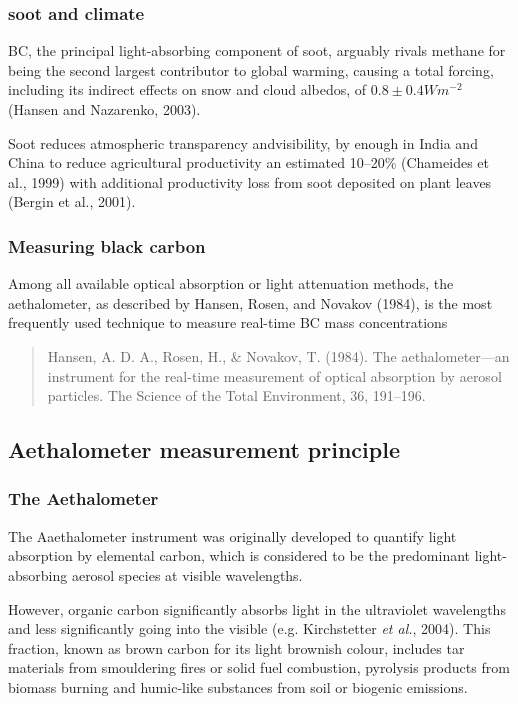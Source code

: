 ﻿\documentclass[ignorenonframetext]{beamer}
\begin{document}
\begin{frame}
\frametitle{soot and climate}
BC, the principal light-absorbing component of soot,
arguably rivals methane for being the second largest
contributor to global warming, causing a total forcing,
including its indirect effects on snow and cloud albedos,
of \(0.8 \pm 0.4 Wm^{-2}\) (Hansen and Nazarenko, 2003).

\bigskip
Soot reduces atmospheric transparency
andvisibility, by enough in India and China to
reduce agricultural productivity an estimated 10–20\%
(Chameides et al., 1999) with additional productivity
loss from soot deposited on plant leaves (Bergin et al.,
2001).
\end{frame}

\begin{frame}
\frametitle{Measuring black carbon}
Among all available optical absorption or light attenuation methods, the
aethalometer, as described by Hansen, Rosen, and Novakov (1984), is the
most frequently used technique to measure real-time BC mass
concentrations

\medskip \begin{quote}
Hansen, A. D. A., Rosen, H., \& Novakov, T. (1984). The
aethalometer---an instrument for the real-time measurement of optical
absorption by aerosol particles. The Science of the Total Environment,
36, 191--196.
\end{quote}
\end{frame}

\subsection{Aethalometer measurement principle}\label{aethalometer-measurement-principle}

\begin{frame}
\frametitle{The Aethalometer}
The Aaethalometer instrument was originally developed to quantify light
absorption by elemental carbon, which is considered to be the
predominant light-absorbing aerosol species at visible wavelengths.

\medskip However, organic carbon significantly absorbs light in the ultraviolet
wavelengths and less significantly going into the visible (e.g.
Kirchstetter \emph{et al.}, 2004). This fraction, known as brown carbon
for its light brownish colour, includes tar materials from smouldering
fires or solid fuel combustion, pyrolysis products from biomass burning
and humic-like substances from soil or biogenic emissions.
\end{frame}
\end{document}
